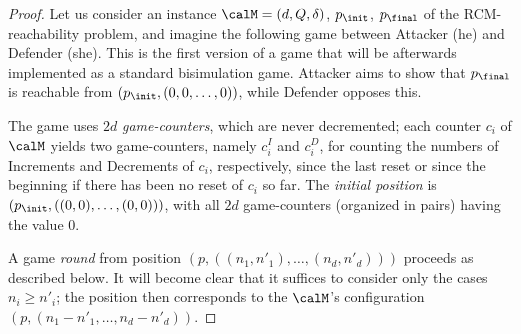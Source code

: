 \documentclass[a4paper,11pt]{article}
\begin{document}
\begin{proof}
Let us consider an instance $\calM=(d,Q,\delta)$,
$p_\init$, $p_\final$ of the RCM-reachability problem,
and imagine the
following game between Attacker (he) and Defender (she). This is the first
version of a game that will be afterwards
implemented as a standard bisimulation game.
Attacker aims to show that $p_\final$ is reachable from 
$(p_{\init}, (0,0,\dots,0))$, while 
Defender opposes this.

The game uses $2d$ \emph{game-counters}, which are never decremented;
each counter $c_i$ of $\calM$ yields two game-counters, namely 
$c_i^I$ and $c_i^D$, for counting the numbers of Increments and
Decrements of $c_i$, respectively, since the last
reset or since the beginning if there has been no reset of $c_i$ so
far.
The \emph{initial position} is 
$(p_\init, ((0,0), \dots,(0,0)))$, with all 
$2d$ game-counters (organized in pairs) having the value $0$.

A game \emph{round} from position $(p,((n_1,n'_1), \dots,
(n_d,n'_d)))$
proceeds as described below.
It will become clear that 
it suffices to consider only the cases $n_i\geq n'_i$;
the position then corresponds to the $\calM$'s configuration
$(p,(n_1{-}n'_1, \dots,  n_d{-}n'_d))$.


\end{proof}
\end{document}
